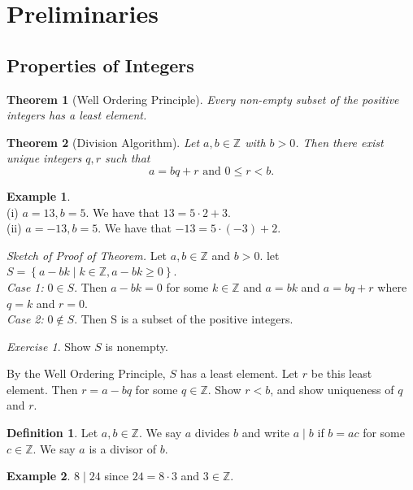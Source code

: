 \documentclass[11pt]{article}
\newcommand{\cbr}[1]{\left\{#1\right\}}
\newcommand{\divides}{\mid}
\newtheorem{theorem}{Theorem}[section]
\theoremstyle{remark}
\theoremstyle{definition}
\newtheorem{definition}{Definition}[section]
\theoremstyle{remark}
\theoremstyle{definition}
\newtheorem*{example}{Example}
\theoremstyle{remark}
\newtheorem*{exercise}{Exercise}
\begin{document}
\section{Preliminaries}

\subsection*{Properties of Integers}
\begin{theorem}[Well Ordering Principle] Every non-empty subset of the positive integers has a least element.
\end{theorem}

\begin{theorem}[Division Algorithm]
  Let $a,b\in\mathbb{Z}$ with $b>0$. Then there exist unique integers $q,r$ such that $$a = bq+r\text{ and } 0\leq r < b.$$
\end{theorem}

\begin{example}\ \\
  (i) $a = 13, b=5$. We have that $13 = 5\cdot 2 + 3$. \\
  (ii) $a = -13, b=5$. We have that $-13 = 5\cdot (-3) + 2$.
\end{example}

\textit{Sketch of Proof of Theorem.} Let $a, b \in\mathbb{Z}$ and $b>0$. let $S = \cbr{a-bk\mid k\in\mathbb{Z}, a-bk\geq 0}$.\\
\textit{Case 1:} $0\in S$. Then $a-bk = 0$ for some $k\in\mathbb{Z}$ and $a = bk$ and $a = bq+r$ where $q=k$ and $r = 0$.\\
\textit{Case 2:} $0\notin S$. Then S is a subset of the positive integers. \begin{exercise} Show $S$ is nonempty. \end{exercise}

By the Well Ordering Principle, $S$ has a least element. Let $r$ be this least element. Then $r =a-bq$ for some $q\in\mathbb{Z}$. Show $r<b$, and show uniqueness of $q$ and $r$.

\begin{definition}
  Let $a,b\in \mathbb{Z}$. We say $a$ divides $b$ and write $a\divides b$ if $b = ac$ for some $c\in\mathbb{Z}$. We say $a$ is a divisor of $b$.
\end{definition}

\begin{example}
  $8\divides 24$ since $24 = 8\cdot 3$ and $3\in\mathbb{Z}$.
\end{example}
\end{document}
